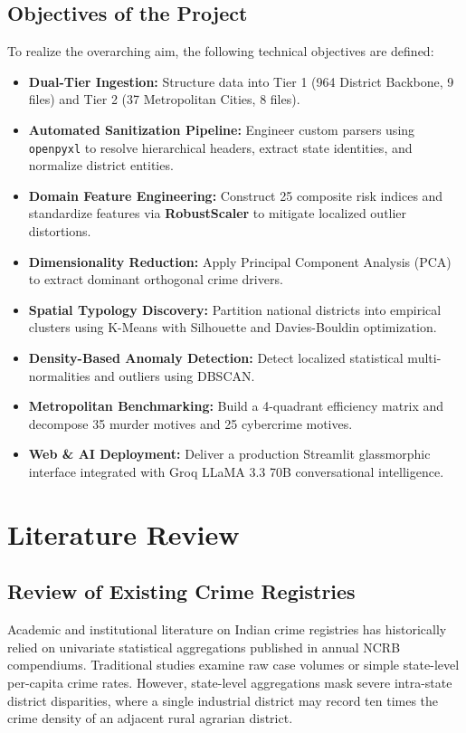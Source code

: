 \documentclass[12pt,a4paper]{report}
\begin{document}
\section{Objectives of the Project}
To realize the overarching aim, the following technical objectives are defined:
\begin{itemize}[leftmargin=*]
    \item \textbf{Dual-Tier Ingestion:} Structure data into Tier 1 (964 District Backbone, 9 files) and Tier 2 (37 Metropolitan Cities, 8 files).
    \item \textbf{Automated Sanitization Pipeline:} Engineer custom parsers using \texttt{openpyxl} to resolve hierarchical headers, extract state identities, and normalize district entities.
    \item \textbf{Domain Feature Engineering:} Construct 25 composite risk indices and standardize features via \textbf{RobustScaler} to mitigate localized outlier distortions.
    \item \textbf{Dimensionality Reduction:} Apply Principal Component Analysis (PCA) to extract dominant orthogonal crime drivers.
    \item \textbf{Spatial Typology Discovery:} Partition national districts into empirical clusters using K-Means with Silhouette and Davies-Bouldin optimization.
    \item \textbf{Density-Based Anomaly Detection:} Detect localized statistical multi-normalities and outliers using DBSCAN.
    \item \textbf{Metropolitan Benchmarking:} Build a 4-quadrant efficiency matrix and decompose 35 murder motives and 25 cybercrime motives.
    \item \textbf{Web & AI Deployment:} Deliver a production Streamlit glassmorphic interface integrated with Groq LLaMA 3.3 70B conversational intelligence.
\end{itemize}

\chapter{Literature Review}

\section{Review of Existing Crime Registries}
Academic and institutional literature on Indian crime registries has historically relied on univariate statistical aggregations published in annual NCRB compendiums. Traditional studies examine raw case volumes or simple state-level per-capita crime rates. However, state-level aggregations mask severe intra-state district disparities, where a single industrial district may record ten times the crime density of an adjacent rural agrarian district.
\end{document}
